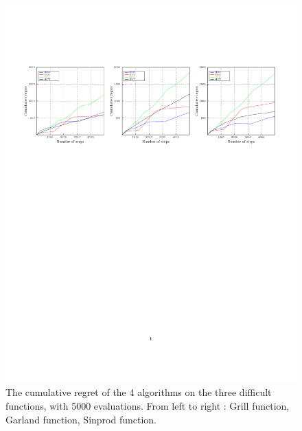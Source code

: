 \documentclass[a4paper,10pt]{article}
\begin{document}
\vspace{-10cm}
\begin{figure}[!ht]
\label{fig:cumulative5000}
\hspace{-5cm}\includegraphics[trim = {0 6cm 0 4.5cm},clip]{cumulative5000.pdf}
\vspace{-12cm}
  \caption{The cumulative regret of the 4 algorithms on the three difficult functions, with 5000 evaluations. From left to right : Grill function, Garland function, Sinprod function. }
\end{figure}
\end{document}
